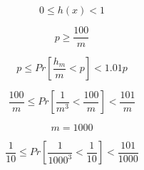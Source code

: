 \subsection*{}

\begin{equation}
    0 \le h(x) < 1
\end{equation}

\begin{equation}
    p \ge \frac{100}{m}
\end{equation}

\begin{equation}
    p \le Pr\left[ \frac{h_{m}}{m} < p \right] < 1.01p
\end{equation}

\begin{equation}
    \frac{100}{m} \le Pr\left[ \frac{1}{m^{3}} < \frac{100}{m} \right] < \frac{101}{m}
\end{equation}

\begin{equation}
    m = 1000
\end{equation}

\begin{equation}
    \frac{1}{10} \le Pr\left[ \frac{1}{1000^{3}} < \frac{1}{10} \right] < \frac{101}{1000}
\end{equation}
